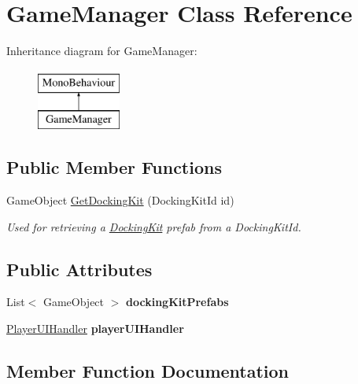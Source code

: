 \hypertarget{class_game_manager}{}\section{Game\+Manager Class Reference}
\label{class_game_manager}
Inheritance diagram for Game\+Manager\+:\begin{figure}[H]
\begin{center}
\leavevmode
\includegraphics[height=2.000000cm]{class_game_manager}
\end{center}
\end{figure}
\subsection*{Public Member Functions}
\begin{DoxyCompactItemize}
\item 
Game\+Object \hyperlink{class_game_manager_ae32b7c2cdcb966074a030b0923064e84}{Get\+Docking\+Kit} (Docking\+Kit\+Id id)
\begin{DoxyCompactList}\small\item\em Used for retrieving a \hyperlink{class_docking_kit}{Docking\+Kit} prefab from a Docking\+Kit\+Id. \end{DoxyCompactList}\end{DoxyCompactItemize}
\subsection*{Public Attributes}
\begin{DoxyCompactItemize}
\item 
\hypertarget{class_game_manager_abdd8e1d2b87ec1d469dd892e5f5f349d}{}\label{class_game_manager_abdd8e1d2b87ec1d469dd892e5f5f349d} 
List$<$ Game\+Object $>$ {\bfseries docking\+Kit\+Prefabs}
\item 
\hypertarget{class_game_manager_a54739d2a9dd9a2da2d93165f6b432810}{}\label{class_game_manager_a54739d2a9dd9a2da2d93165f6b432810} 
\hyperlink{class_player_u_i_handler}{Player\+U\+I\+Handler} {\bfseries player\+U\+I\+Handler}
\end{DoxyCompactItemize}


\subsection{Member Function Documentation}
\hypertarget{class_game_manager_ae32b7c2cdcb966074a030b0923064e84}{}\label{class_game_manager_ae32b7c2cdcb966074a030b0923064e84} 
